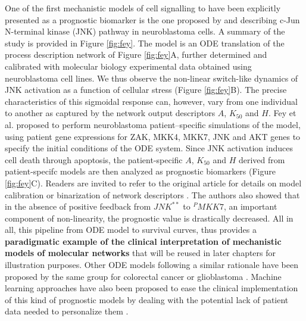 \documentclass[a4paper,12pt,twoside,onecolumn,openright,final,oldfontcommands]{memoir}
\begin{document}
One of the first mechanistic models of cell signalling to have been
explicitly presented as a prognostic biomarker is the one proposed by
\citet{fey2015signaling} and describing c-Jun N-terminal kinase (JNK)
pathway in neuroblastoma cells. A summary of the study is provided in
Figure \ref{fig:fey}. The model is an ODE translation of the process
description network of Figure \ref{fig:fey}A, further determined and
calibrated with molecular biology experimental data obtained using
neuroblastoma cell lines. We thus observe the non-linear switch-like
dynamics of JNK activation as a function of cellular stress (Figure
\ref{fig:fey}B). The precise characteristics of this sigmoidal response
can, however, vary from one individual to another as captured by the
network output descriptors \(A\), \(K_{50}\) and \(H\). Fey et al.
proposed to perform neuroblastoma patient--specific simulations of the
model, using patient gene expressions for ZAK, MKK4, MKK7, JNK and AKT
genes to specify the initial conditions of the ODE system. Since JNK
activation induces cell death through apoptosis, the patient-specific
\(A\), \(K_{50}\) and \(H\) derived from patient-specifc models are then
analyzed as prognostic biomarkers (Figure \ref{fig:fey}C). Readers are
invited to refer to the original article for details on model
calibration or binarization of network descriptors
\citep{fey2015signaling}. The authors also showed that in the absence of
positive feedback from \(JNK^{**}\) to \(^PMKK7\), an important
component of non-linearity, the prognostic value is drastically
decreased. All in all, this pipeline from ODE model to survival curves,
thus provides a \textbf{paradigmatic example of the clinical
interpretation of mechanistic models of molecular networks} that will be
reused in later chapters for illustration purposes. Other ODE models
following a similar rationale have been proposed by the same group for
colorectal cancer \citep{hector2012clinical, salvucci2017stepwise} or
glioblastoma \citep{murphy2013activation, salvucci2019system}. Machine
learning approaches have also been proposed to ease the clinical
implementation of this kind of prognostic models by dealing with the
potential lack of patient data needed to personalize them
\citep{salvucci2019machine}.
\end{document}
